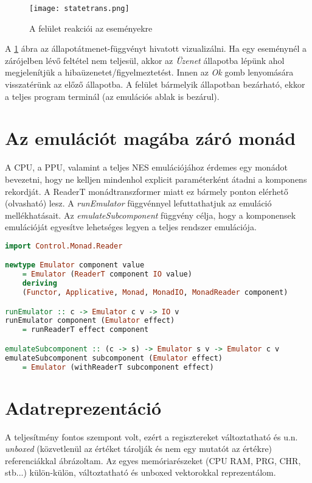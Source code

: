 \begin{figure}[H]
	\centering
	\texttt{[image: statetrans.png]}
	\caption{A felület reakciói az eseményekre}
	\label{fig:states}
\end{figure}

A \ref{fig:states} ábra az állapotátmenet-függvényt hivatott vizualizálni. Ha egy eseménynél a zárójelben lévő feltétel nem teljesül, akkor az \emph{Üzenet} állapotba lépünk ahol megjelenítjük a hibaüzenetet/figyelmeztetést. Innen az \emph{Ok} gomb lenyomására visszatérünk az előző állapotba. A felület bármelyik állapotban bezárható, ekkor a teljes program terminál (az emulációs ablak is bezárul).

\section{Az emulációt magába záró monád}

A CPU, a PPU, valamint a teljes NES emulációjához érdemes egy monádot bevezetni, hogy ne kelljen mindenhol explicit paraméterként átadni a komponens rekordját. A ReaderT monádtranszformer miatt ez bármely ponton elérhető (olvasható) lesz. A \emph{runEmulator} függvénnyel lefuttathatjuk az emuláció mellékhatásait. Az \emph{emulateSubcomponent} függvény célja, hogy a komponensek emulációját egyesítve lehetséges legyen a teljes rendszer emulációja.

\begin{lstlisting}[language=Haskell]
import Control.Monad.Reader

newtype Emulator component value 
	= Emulator (ReaderT component IO value) 
	deriving 
	(Functor, Applicative, Monad, MonadIO, MonadReader component)

runEmulator :: c -> Emulator c v -> IO v
runEmulator component (Emulator effect) 
	= runReaderT effect component

emulateSubcomponent :: (c -> s) -> Emulator s v -> Emulator c v
emulateSubcomponent subcomponent (Emulator effect) 
	= Emulator (withReaderT subcomponent effect)

\end{lstlisting}

\section{Adatreprezentáció}

A teljesítmény fontos szempont volt, ezért a regisztereket változtatható és u.n. \emph{unboxed} (közvetlenül az értéket tárolják és nem egy mutatót az értékre) referenciákkal ábrázoltam. Az egyes memóriarészeket (CPU RAM, PRG, CHR, stb...) külön-külön, változtatható és unboxed vektorokkal reprezentálom.

